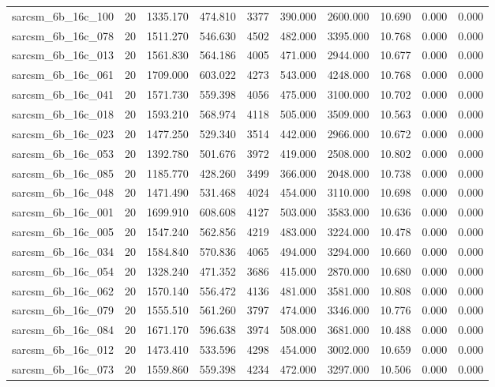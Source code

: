 \begin{tabular}{lrrrrrrrrr}
sarcsm\_6b\_16c\_100 & 20 & 1335.170 & 474.810 & 3377 & 390.000 & 2600.000 & 10.690 & 0.000 & 0.000 \\
sarcsm\_6b\_16c\_078 & 20 & 1511.270 & 546.630 & 4502 & 482.000 & 3395.000 & 10.768 & 0.000 & 0.000 \\
sarcsm\_6b\_16c\_013 & 20 & 1561.830 & 564.186 & 4005 & 471.000 & 2944.000 & 10.677 & 0.000 & 0.000 \\
sarcsm\_6b\_16c\_061 & 20 & 1709.000 & 603.022 & 4273 & 543.000 & 4248.000 & 10.768 & 0.000 & 0.000 \\
sarcsm\_6b\_16c\_041 & 20 & 1571.730 & 559.398 & 4056 & 475.000 & 3100.000 & 10.702 & 0.000 & 0.000 \\
sarcsm\_6b\_16c\_018 & 20 & 1593.210 & 568.974 & 4118 & 505.000 & 3509.000 & 10.563 & 0.000 & 0.000 \\
sarcsm\_6b\_16c\_023 & 20 & 1477.250 & 529.340 & 3514 & 442.000 & 2966.000 & 10.672 & 0.000 & 0.000 \\
sarcsm\_6b\_16c\_053 & 20 & 1392.780 & 501.676 & 3972 & 419.000 & 2508.000 & 10.802 & 0.000 & 0.000 \\
sarcsm\_6b\_16c\_085 & 20 & 1185.770 & 428.260 & 3499 & 366.000 & 2048.000 & 10.738 & 0.000 & 0.000 \\
sarcsm\_6b\_16c\_048 & 20 & 1471.490 & 531.468 & 4024 & 454.000 & 3110.000 & 10.698 & 0.000 & 0.000 \\
sarcsm\_6b\_16c\_001 & 20 & 1699.910 & 608.608 & 4127 & 503.000 & 3583.000 & 10.636 & 0.000 & 0.000 \\
sarcsm\_6b\_16c\_005 & 20 & 1547.240 & 562.856 & 4219 & 483.000 & 3224.000 & 10.478 & 0.000 & 0.000 \\
sarcsm\_6b\_16c\_034 & 20 & 1584.840 & 570.836 & 4065 & 494.000 & 3294.000 & 10.660 & 0.000 & 0.000 \\
sarcsm\_6b\_16c\_054 & 20 & 1328.240 & 471.352 & 3686 & 415.000 & 2870.000 & 10.680 & 0.000 & 0.000 \\
sarcsm\_6b\_16c\_062 & 20 & 1570.140 & 556.472 & 4136 & 481.000 & 3581.000 & 10.808 & 0.000 & 0.000 \\
sarcsm\_6b\_16c\_079 & 20 & 1555.510 & 561.260 & 3797 & 474.000 & 3346.000 & 10.776 & 0.000 & 0.000 \\
sarcsm\_6b\_16c\_084 & 20 & 1671.170 & 596.638 & 3974 & 508.000 & 3681.000 & 10.488 & 0.000 & 0.000 \\
sarcsm\_6b\_16c\_012 & 20 & 1473.410 & 533.596 & 4298 & 454.000 & 3002.000 & 10.659 & 0.000 & 0.000 \\
sarcsm\_6b\_16c\_073 & 20 & 1559.860 & 559.398 & 4234 & 472.000 & 3297.000 & 10.506 & 0.000 & 0.000 \\

\end{tabular}
